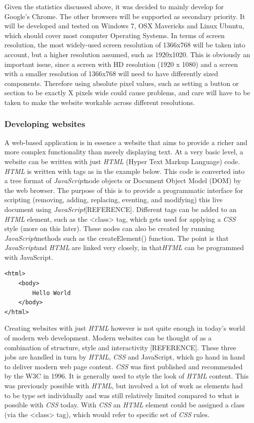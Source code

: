 \documentclass[a4paper,11pt,twoside]{article}
\begin{document}
Given the statistics discussed above, it was decided to mainly develop for Google's Chrome. The other browsers will be supported as secondary priority. It will be developed and tested on Windows 7, OSX Mavericks and Linux Ubuntu, which should cover most computer Operating Systems. In terms of screen resolution, the most widely-used screen resolution of 1366x768 will be taken into account, but a higher resolution assumed, such as 1920x1020. This is obviously an important issue, since a screen with HD resolution (1920 x 1080) and a screen with a smaller resolution of 1366x768 will need to have differently sized components. Therefore using absolute pixel values, such as setting a button or section to be exactly X pixels wide could cause problems, and care will have to be taken to make the website workable across different resolutions.





\subsubsection{Developing websites}

A web-based application is in essence a website that aims to provide a richer and more complex functionality than merely displaying text. At a very basic level, a website can be written with just \textit{HTML} (Hyper Text Markup Language) code. \textit{HTML} is written with tags as in the example below. This code is converted into a tree format of \textit{JavaScript}node objects or Document Object Model (DOM) by the web browser. The purpose of this is to provide a programmatic interface for scripting (removing, adding, replacing, eventing, and modifying) this live document using \textit{JavaScript}[REFERENCE]. Different tags can be added to an \textit{HTML} element, such as the <class> tag, which gets used for applying a \textit{CSS} style (more on this later). These nodes can also be created by running \textit{JavaScript}methods such as the createElement() function. The point is that \textit{JavaScript}and \textit{HTML} are linked very closely, in that\textit {HTML} can be programmed with JavaScript.

\begin{verbatim}
<html>
    <body>
        Hello World
    </body>
</html>
\end{verbatim}

Creating websites with just \textit{HTML} however is not quite enough in today's world of modern web development. Modern websites can be thought of as a combination of structure, style and interactivity [REFERENCE]. These three jobs are handled in turn by \textit{HTML}, \textit{CSS} and JavaScript, which go hand in hand to deliver modern web page content. \textit{CSS} was first published and recommended by the W3C in 1996. It is generally used to style the look of \textit{HTML} content. This was previously possible with \textit{HTML}, but involved a lot of work as elements had to be type set individually and was still relatively limited compared to what is possible with \textit{CSS} today. With \textit{CSS} an \textit{HTML} element could be assigned a class (via the <class> tag), which would refer to specific set of \textit{CSS} rules.
\end{document}
